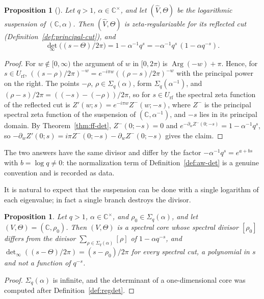 \documentclass[11pt]{amsart}
\theoremstyle{plain}
\newtheorem{proposition}[theorem]{Proposition}
\theoremstyle{definition}
\theoremstyle{remark}
\numberwithin{equation}{section}
\newcommand{\C}{\mathbb{C}}
\newcommand{\detreg}{{\det}_{\infty}}
\begin{document}
\begin{proposition}[{\cite[(2.10), p.~11, and~(4.1), p.~16]%
{Deninger1994Motivic}}]\label{prop:ff-cut}
Let $q>1$, $\alpha\in\C^\times$, and let $(\widehat V,\Theta)$ be the
logarithmic suspension of $(\C,\alpha)$. Then $(\widehat V,\Theta)$ is
zeta-regularizable for its reflected cut
(Definition~\ref{def:principal-cut}), and
\[
\detreg\bigl((s-\Theta)/2\pi\bigr)=1-\alpha^{-1}q^{s}=
-\alpha^{-1}q^{s}\,(1-\alpha q^{-s}).
\]
\end{proposition}

\begin{proof}
For $w\notin[0,\infty)$ the argument of $w$ in $[0,2\pi)$ is
$\operatorname{Arg}(-w)+\pi$. Hence, for $s\in U_{\mathrm{rf}}$,
$((s-\rho)/2\pi)^{-w}=e^{-i\pi w}((\rho-s)/2\pi)^{-w}$ with the
principal power on the right. The points $-\rho$, $\rho\in
\Sigma_q(\alpha)$, form $\Sigma_q(\alpha^{-1})$, and
$(\rho-s)/2\pi=((-s)-(-\rho))/2\pi$, so for $s\in U_{\mathrm{rf}}$ the
spectral zeta function of the reflected cut is
$Z'(w;s)=e^{-i\pi w}Z^-(w;-s)$,
where $Z^-$ is the principal spectral zeta function of the suspension of
$(\C,\alpha^{-1})$, and $-s$ lies in its principal domain. By
Theorem~\ref{thm:ff-det}, $Z^-(0;-s)=0$ and
$e^{-\partial_wZ^-(0;-s)}=1-\alpha^{-1}q^{s}$, so
$-\partial_wZ'(0;s)=i\pi Z^-(0;-s)-\partial_wZ^-(0;-s)$ gives the
claim.
\end{proof}

The two answers have the same divisor and differ by the factor
$-\alpha^{-1}q^s=e^{a+bs}$ with $b=\log q\ne0$: the normalization term of
Definition~\ref{def:aw-det} is a genuine convention and is recorded as
data.

It is natural to expect that the suspension can be done with a single
logarithm of each eigenvalue; in fact a single branch destroys the
divisor.

\begin{proposition}\label{prop:one-branch}
Let $q>1$, $\alpha\in\C^\times$, and $\rho_0\in\Sigma_q(\alpha)$, and let
$(V,\Theta)=(\C,\rho_0)$. Then $(V,\Theta)$ is a spectral core whose
spectral divisor $[\rho_0]$ differs from the divisor
$\sum_{\rho\in\Sigma_q(\alpha)}[\rho]$ of $1-\alpha q^{-s}$, and
$\detreg((s-\Theta)/2\pi)=(s-\rho_0)/2\pi$ for every spectral cut, a
polynomial in $s$ and not a function of $q^{-s}$.
\end{proposition}

\begin{proof}
$\Sigma_q(\alpha)$ is infinite, and the determinant of a
one-dimensional core was computed after Definition~\ref{def:regdet}.
\end{proof}
\end{document}
